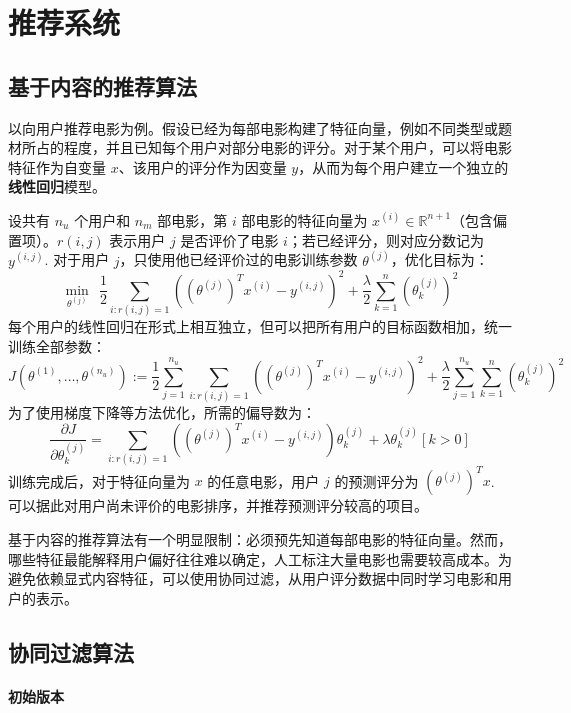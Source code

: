 \section{推荐系统}
\label{sec:chapter14}

\subsection{基于内容的推荐算法}

以向用户推荐电影为例。假设已经为每部电影构建了特征向量，例如不同类型或题材所占的程度，并且已知每个用户对部分电影的评分。对于某个用户，可以将电影特征作为自变量 $x$、该用户的评分作为因变量 $y$，从而为每个用户建立一个独立的\textbf{线性回归}模型。

设共有 $n_u$ 个用户和 $n_m$ 部电影，第 $i$ 部电影的特征向量为 $x^{(i)}\in\mathbb R^{n+1}$（包含偏置项）。$r(i,j)$ 表示用户 $j$ 是否评价了电影 $i$；若已经评分，则对应分数记为 $y^{(i,j)}$. 对于用户 $j$，只使用他已经评价过的电影训练参数 $\theta^{(j)}$，优化目标为：
\[
\min_{\theta^{(j)}}~~\frac{1}{2}\sum_{i:r(i,j)=1}\left((\theta^{(j)})^Tx^{(i)}-y^{(i,j)}\right)^2+\frac{\lambda}{2}\sum_{k=1}^{n}(\theta_k^{(j)})^2
\]
每个用户的线性回归在形式上相互独立，但可以把所有用户的目标函数相加，统一训练全部参数：
\[
J(\theta^{(1)},\ldots,\theta^{(n_u)}):=\frac{1}{2}\sum_{j=1}^{n_u}\sum_{i:r(i,j)=1}\left((\theta^{(j)})^Tx^{(i)}-y^{(i,j)}\right)^2+\frac{\lambda}{2}\sum_{j=1}^{n_u}\sum_{k=1}^{n}(\theta_k^{(j)})^2
\]
为了使用梯度下降等方法优化，所需的偏导数为：
\[
\frac{\partial J}{\partial\theta^{(j)}_k}=\sum_{i:r(i,j)=1}\left((\theta^{(j)})^Tx^{(i)}-y^{(i,j)}\right)\theta^{(j)}_k+\lambda\theta_k^{(j)}[k>0]
\]
训练完成后，对于特征向量为 $x$ 的任意电影，用户 $j$ 的预测评分为 $(\theta^{(j)})^Tx$. 可以据此对用户尚未评价的电影排序，并推荐预测评分较高的项目。

基于内容的推荐算法有一个明显限制：必须预先知道每部电影的特征向量。然而，哪些特征最能解释用户偏好往往难以确定，人工标注大量电影也需要较高成本。为避免依赖显式内容特征，可以使用协同过滤，从用户评分数据中同时学习电影和用户的表示。


\subsection{协同过滤算法}

\paragraph{初始版本}

